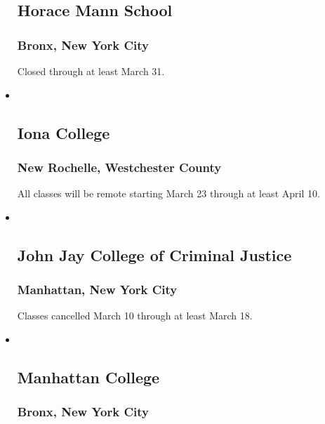 \begin{itemize}
{  \subsection{Horace Mann School}\label{horace-mann-school}}

  \hypertarget{bronx-new-york-city-1}{%
  \subsubsection{Bronx, New York City}\label{bronx-new-york-city-1}}

  Closed through at least March 31.
\item ~
  \hypertarget{iona-college}{%
  \subsection{Iona College}\label{iona-college}}

  \hypertarget{new-rochelle-westchester-county}{%
  \subsubsection{New Rochelle, Westchester
  County}\label{new-rochelle-westchester-county}}

  All classes will be remote starting March 23 through at least April
  10.
\item ~
  \hypertarget{john-jay-college-of-criminal-justice}{%
  \subsection{John Jay College of Criminal
  Justice}\label{john-jay-college-of-criminal-justice}}

  \hypertarget{manhattan-new-york-city-6}{%
  \subsubsection{Manhattan, New York
  City}\label{manhattan-new-york-city-6}}

  Classes cancelled March 10 through at least March 18.
\item ~
  \hypertarget{manhattan-college}{%
  \subsection{Manhattan College}\label{manhattan-college}}

  \hypertarget{bronx-new-york-city-2}{%
  \subsubsection{Bronx, New York City}\label{bronx-new-york-city-2}}


\end{itemize}
